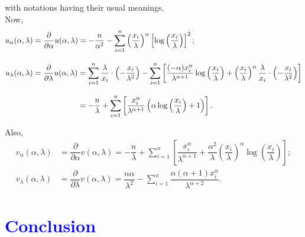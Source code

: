 \documentclass[11pt, a4paper]{article}\usepackage[]{graphicx}\usepackage[]{xcolor}
\begin{document}
with notations having their usual meanings. \\

Now,
\begin{align*}
u_{\alpha}(\alpha, \lambda) &= \dfrac{\partial}{\partial \alpha} u(\alpha, \lambda) = -\dfrac{n}{\alpha^2} - \sum \limits_{i=1}^{n} \left( \dfrac{x_i}{\lambda} \right)^{\alpha} \left[ \log \left( \dfrac{x_i}{\lambda} \right) \right]^2;\\[0.3cm]
u_{\lambda}(\alpha, \lambda) &= \dfrac{\partial}{\partial \lambda} u(\alpha, \lambda) =
\sum \limits_{i=1}^{n} \dfrac{\lambda}{x_i} \cdot \left( -\dfrac{x_i}{\lambda^2} \right)
- \sum \limits_{i=1}^{n} \left[\dfrac{(-\alpha) x_i^{\alpha}}{\lambda^{\alpha + 1}} \log \left( \dfrac{x_i}{\lambda} \right) + \left( \dfrac{x_i}{\lambda} \right)^{\alpha}\dfrac{\lambda}{x_i} \cdot \left( -\dfrac{x_i}{\lambda^2} \right) \right]\\[0.3cm]
&\phantom{= \frac{\partial}{\partial \lambda} u(\alpha, \lambda) \hspace{0.1cm}} = -\dfrac{n}{\lambda} + \sum \limits_{i=1}^{n} \left[\dfrac{x_i^{\alpha}}{\lambda^{\alpha + 1}} \left( \alpha \log \left( \dfrac{x_i}{\lambda} \right) + 1 \right) \right].
\end{align*}

Also,
\begin{align*}
v_{\alpha}(\alpha, \lambda) &= \dfrac{\partial}{\partial \alpha} v(\alpha, \lambda) =
-\dfrac{n}{\lambda} + \sum \limits_{i=1}^{n} \left[\dfrac{x_i^{\alpha}}{\lambda^{\alpha + 1}}
+ \dfrac{\alpha^2}{\lambda} \left( \dfrac{x_i}{\lambda} \right)^{\alpha} \log \left( \dfrac{x_i}{\lambda} \right) \right];\\[0.3cm]
v_{\lambda}(\alpha, \lambda) &= \dfrac{\partial}{\partial \lambda} v(\alpha, \lambda) =
\dfrac{n \alpha}{\lambda^2} - \sum \limits_{i=1}^{n} \dfrac{\alpha(\alpha + 1) x_i^{\alpha}}{\lambda^{\alpha + 2}}.
\end{align*}

\section*{\faArrowAltCircleRight[regular] \textcolor{blue}{Conclusion}}

\smallpencil \hspace{1cm} %
\end{document}
